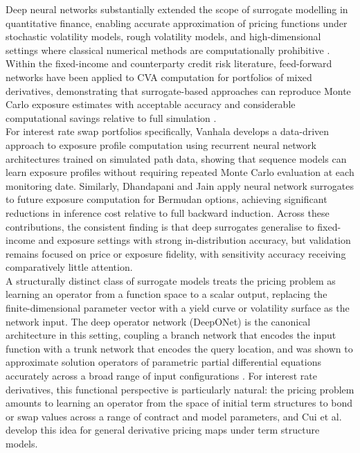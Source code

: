     \noindent
    Deep neural networks substantially extended the scope of surrogate modelling in quantitative finance, enabling accurate approximation of pricing functions under stochastic volatility models, rough volatility models, and high-dimensional settings where classical numerical methods are computationally prohibitive \cite{horvath2020deeplearning, hutzenthaler2020overcoming}. Within the fixed-income and counterparty credit risk literature, feed-forward networks have been applied to CVA computation for portfolios of mixed derivatives, demonstrating that surrogate-based approaches can reproduce Monte Carlo exposure estimates with acceptable accuracy and considerable computational savings relative to full simulation \cite{andersson2021deeplearning}. \\

    \noindent
    For interest rate swap portfolios specifically, Vanhala \cite{vanhala2023dataxva} develops a data-driven approach to exposure profile computation using recurrent neural network architectures trained on simulated path data, showing that sequence models can learn exposure profiles without requiring repeated Monte Carlo evaluation at each monitoring date. Similarly, Dhandapani and Jain \cite{dhandapani2024optimizing} apply neural network surrogates to future exposure computation for Bermudan options, achieving significant reductions in inference cost relative to full backward induction. Across these contributions, the consistent finding is that deep surrogates generalise to fixed-income and exposure settings with strong in-distribution accuracy, but validation remains focused on price or exposure fidelity, with sensitivity accuracy receiving comparatively little attention. \\

    \noindent
    A structurally distinct class of surrogate models treats the pricing problem as learning an operator from a function space to a scalar output, replacing the finite-dimensional parameter
  vector with a yield curve or volatility surface as the network input. The deep operator network (DeepONet) is the canonical architecture in this setting, coupling a branch network that
  encodes the input function with a trunk network that encodes the query location, and was shown to approximate solution operators of parametric partial differential equations accurately
  across a broad range of input configurations \cite{wang2021learning}. For interest rate derivatives, this functional perspective is particularly natural: the pricing problem
  amounts to learning an operator from the space of initial term structures to bond or swap values across a range of contract and model parameters, and Cui et al.\
  \cite{cui2023learning} develop this idea for general derivative pricing maps under term structure models. \\

